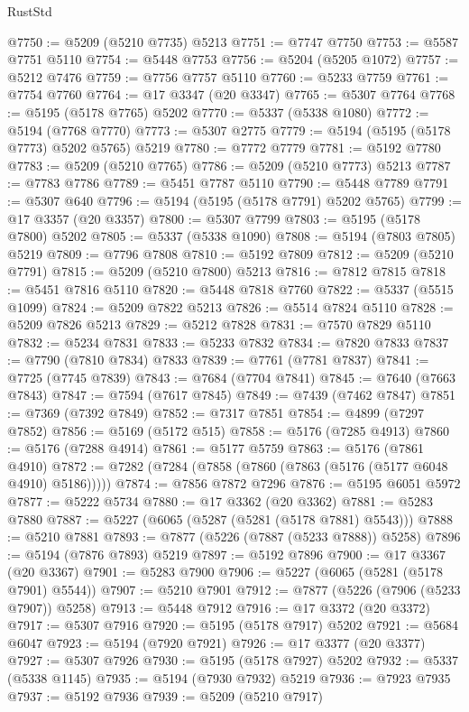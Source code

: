 \begin{lexlean}{RustStd}
\begin{coremodule}
@7750 := @5209 (@5210 @7735) @5213
@7751 := @7747 @7750
@7753 := @5587 @7751 @5110
@7754 := @5448 @7753
@7756 := @5204 (@5205 @1072)
@7757 := @5212 @7476
@7759 := @7756 @7757 @5110
@7760 := @5233 @7759
@7761 := @7754 @7760
@7764 := @17 @3347 (@20 @3347)
@7765 := @5307 @7764
@7768 := @5195 (@5178 @7765) @5202
@7770 := @5337 (@5338 @1080)
@7772 := @5194 (@7768 @7770)
@7773 := @5307 @2775
@7779 := @5194 (@5195 (@5178 @7773) @5202 @5765) @5219
@7780 := @7772 @7779
@7781 := @5192 @7780
@7783 := @5209 (@5210 @7765)
@7786 := @5209 (@5210 @7773) @5213
@7787 := @7783 @7786
@7789 := @5451 @7787 @5110
@7790 := @5448 @7789
@7791 := @5307 @640
@7796 := @5194 (@5195 (@5178 @7791) @5202 @5765)
@7799 := @17 @3357 (@20 @3357)
@7800 := @5307 @7799
@7803 := @5195 (@5178 @7800) @5202
@7805 := @5337 (@5338 @1090)
@7808 := @5194 (@7803 @7805) @5219
@7809 := @7796 @7808
@7810 := @5192 @7809
@7812 := @5209 (@5210 @7791)
@7815 := @5209 (@5210 @7800) @5213
@7816 := @7812 @7815
@7818 := @5451 @7816 @5110
@7820 := @5448 @7818 @7760
@7822 := @5337 (@5515 @1099)
@7824 := @5209 @7822 @5213
@7826 := @5514 @7824 @5110
@7828 := @5209 @7826 @5213
@7829 := @5212 @7828
@7831 := @7570 @7829 @5110
@7832 := @5234 @7831
@7833 := @5233 @7832
@7834 := @7820 @7833
@7837 := @7790 (@7810 @7834) @7833
@7839 := @7761 (@7781 @7837)
@7841 := @7725 (@7745 @7839)
@7843 := @7684 (@7704 @7841)
@7845 := @7640 (@7663 @7843)
@7847 := @7594 (@7617 @7845)
@7849 := @7439 (@7462 @7847)
@7851 := @7369 (@7392 @7849)
@7852 := @7317 @7851
@7854 := @4899 (@7297 @7852)
@7856 := @5169 (@5172 @515)
@7858 := @5176 (@7285 @4913)
@7860 := @5176 (@7288 @4914)
@7861 := @5177 @5759
@7863 := @5176 (@7861 @4910)
@7872 := @7282 (@7284 (@7858 (@7860 (@7863 (@5176 (@5177 @6048 @4910) @5186)))))
@7874 := @7856 @7872 @7296
@7876 := @5195 @6051 @5972
@7877 := @5222 @5734
@7880 := @17 @3362 (@20 @3362)
@7881 := @5283 @7880
@7887 := @5227 (@6065 (@5287 (@5281 (@5178 @7881) @5543)))
@7888 := @5210 @7881
@7893 := @7877 (@5226 (@7887 (@5233 @7888)) @5258)
@7896 := @5194 (@7876 @7893) @5219
@7897 := @5192 @7896
@7900 := @17 @3367 (@20 @3367)
@7901 := @5283 @7900
@7906 := @5227 (@6065 (@5281 (@5178 @7901) @5544))
@7907 := @5210 @7901
@7912 := @7877 (@5226 (@7906 (@5233 @7907)) @5258)
@7913 := @5448 @7912
@7916 := @17 @3372 (@20 @3372)
@7917 := @5307 @7916
@7920 := @5195 (@5178 @7917) @5202
@7921 := @5684 @6047
@7923 := @5194 (@7920 @7921)
@7926 := @17 @3377 (@20 @3377)
@7927 := @5307 @7926
@7930 := @5195 (@5178 @7927) @5202
@7932 := @5337 (@5338 @1145)
@7935 := @5194 (@7930 @7932) @5219
@7936 := @7923 @7935
@7937 := @5192 @7936
@7939 := @5209 (@5210 @7917)

\end{coremodule}
\end{lexlean}
